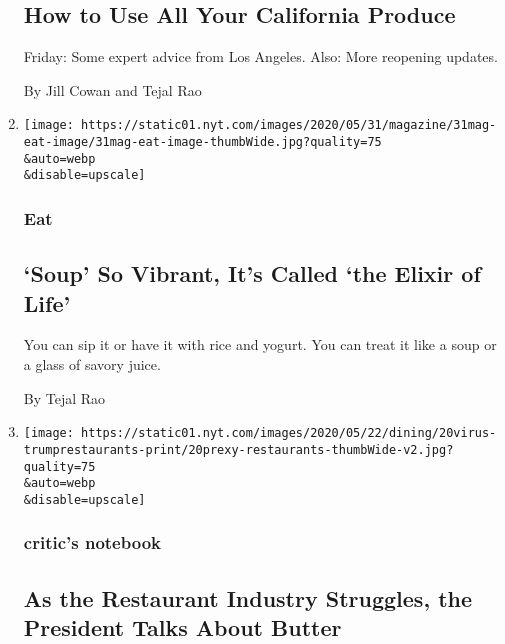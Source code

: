 \begin{enumerate}
  \hypertarget{how-to-use-all-your-california-produce}{%
  \subsection{How to Use All Your California
  Produce}\label{how-to-use-all-your-california-produce}}

  Friday: Some expert advice from Los Angeles. Also: More reopening
  updates.

  By Jill Cowan and Tejal Rao
\item
  \href{/2020/05/27/magazine/soup-so-vibrant-its-called-the-elixir-of-life.html}{}

  \texttt{[image: https://static01.nyt.com/images/2020/05/31/magazine/31mag-eat-image/31mag-eat-image-thumbWide.jpg?quality=75\\\&auto=webp\\\&disable=upscale]}

  \hypertarget{eat}{%
  \subsubsection{Eat}\label{eat}}

  \hypertarget{soup-so-vibrant-its-called-the-elixir-of-life}{%
  \subsection{`Soup' So Vibrant, It's Called `the Elixir of
  Life'}\label{soup-so-vibrant-its-called-the-elixir-of-life}}

  You can sip it or have it with rice and yogurt. You can treat it like
  a soup or a glass of savory juice.

  By Tejal Rao
\item
  \href{/2020/05/21/dining/white-house-trump-restaurant-panel-meeting.html}{}

  \texttt{[image: https://static01.nyt.com/images/2020/05/22/dining/20virus-trumprestaurants-print/20prexy-restaurants-thumbWide-v2.jpg?quality=75\\\&auto=webp\\\&disable=upscale]}

  \hypertarget{critics-notebook-4}{%
  \subsubsection{critic's notebook}\label{critics-notebook-4}}

  \hypertarget{as-the-restaurant-industry-struggles-the-president-talks-about-butter}{%
  \subsection{As the Restaurant Industry Struggles, the President Talks
  About
  Butter}\label{as-the-restaurant-industry-struggles-the-president-talks-about-butter}}


\end{enumerate}
